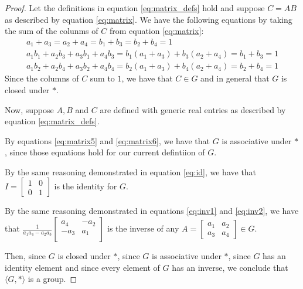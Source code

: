 \documentclass[12pt]{article}
\newcommand{\ainverse}{\frac{1}{a_1 a_4 - a_2 a_3}\begin{bmatrix} a_4 & -a_2 \\ -a_3 & a_1 \\ \end{bmatrix}}
\begin{document}
\begin{proof}
	Let the definitions in equation \ref{eq:matrix_defs} hold and suppose $C = AB$ as described by equation \ref{eq:matrix}. We have the following equations by taking the sum of the colunms of $C$ from equation \ref{eq:matrix}:
	\begin{align}
		a_1 + a_3 = a_2 + a_4 = b_1 + b_3 = b_2 + b_4 = 1 \\
		a_1 b_1 + a_2 b_3 + a_3 b_1 + a_4 b_3 = b_1(a_1+a_3) + b_3(a_2+a_4) = b_1 + b_3 = 1 \\
		a_1 b_2 + a_2 b_4 + a_3 b_2 + a_4 b_4 = b_2(a_1+a_3) + b_4(a_2+a_4) = b_2 + b_4 = 1
	\end{align}
	Since the columns of $C$ sum to $1$, we have that $C \in G$ and in general that $G$ is closed under $*$.

	Now, suppose $A,B$ and $C$ are defined with generic real entries as described by equation \ref{eq:matrix_defs}.

By equations \ref{eq:matrix5} and \ref{eq:matrix6}, we have that $G$ is associative under $*$, since those equations hold for our current defintiion of $G$.

By the same reasoning demonstrated in equation \ref{eq:id}, we have that $I = \begin{bmatrix} 1 & 0 \\ 0 & 1 \end{bmatrix}$ is the identity for $G$.

By the same reasoning demonstrated in equations \ref{eq:inv1} and \ref{eq:inv2}, we have that $\ainverse$ is the inverse of any $A = \begin{bmatrix} a_1 & a_2 \\ a_3 & a_4 \end{bmatrix} \in G$.

Then, since $G$ is closed under $*$, since $G$ is associative under $*$, since $G$ has an identity element and since every element of $G$ has an inverse, we conclude that $\langle G, * \rangle$ is a group.

\end{proof}

\pagebreak
\end{document}
